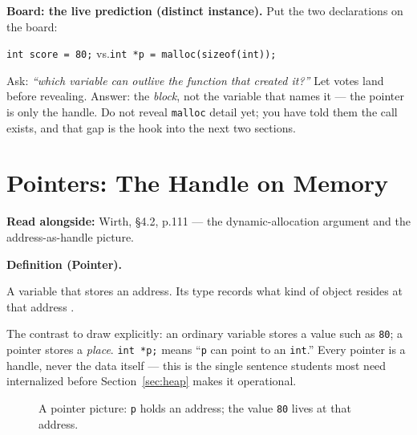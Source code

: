 \documentclass[11pt]{article}
\newenvironment{definitionbox}[1]{%
  \par\noindent\textbf{Definition (#1).}\ \itshape
}{\par\vspace{0.3em}}
\begin{document}
\textbf{Board: the live prediction (distinct instance).} Put the two declarations on the board:
\begin{center}
\texttt{int score = 80;} \quad vs.\quad \texttt{int *p = malloc(sizeof(int));}
\end{center}
Ask: \emph{``which variable can outlive the function that created it?''} Let votes land before revealing. Answer: the \emph{block}, not the variable that names it --- the pointer is only the handle. Do not reveal \texttt{malloc} detail yet; you have told them the call exists, and that gap is the hook into the next two sections.

\section{Pointers: The Handle on Memory}
\label{sec:pointers}

\textbf{Read alongside:} Wirth, \S4.2, p.111 --- the dynamic-allocation argument and the address-as-handle picture.

\begin{definitionbox}{Pointer}
A variable that stores an address. Its type records what kind of object resides at that address \cite{Wirth2004_algorithms_data_structures}.
\end{definitionbox}

The contrast to draw explicitly: an ordinary variable stores a value such as \texttt{80}; a pointer stores a \emph{place}. \texttt{int *p;} means ``\texttt{p} can point to an \texttt{int}.'' Every pointer is a handle, never the data itself --- this is the single sentence students most need internalized before Section~\ref{sec:heap} makes it operational.

\begin{figure}[h]
  \centering
  \caption{A pointer picture: \texttt{p} holds an address; the value
  \texttt{80} lives at that address.}
  \label{fig:pointer-picture}
\end{figure}
\end{document}

